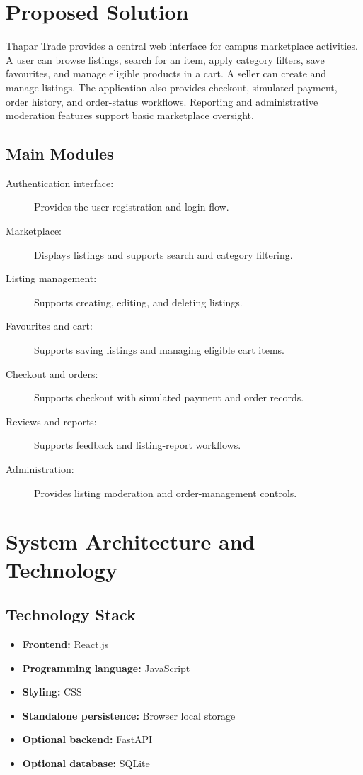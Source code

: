 \documentclass[12pt,a4paper]{report}
\begin{document}
\chapter{Proposed Solution}
Thapar Trade provides a central web interface for campus marketplace activities.
A user can browse listings, search for an item, apply category filters, save
favourites, and manage eligible products in a cart. A seller can create and
manage listings. The application also provides checkout, simulated payment,
order history, and order-status workflows. Reporting and administrative
moderation features support basic marketplace oversight.

\section{Main Modules}
\begin{description}
    \item[Authentication interface:] Provides the user registration and login flow.
    \item[Marketplace:] Displays listings and supports search and category filtering.
    \item[Listing management:] Supports creating, editing, and deleting listings.
    \item[Favourites and cart:] Supports saving listings and managing eligible cart items.
    \item[Checkout and orders:] Supports checkout with simulated payment and order records.
    \item[Reviews and reports:] Supports feedback and listing-report workflows.
    \item[Administration:] Provides listing moderation and order-management controls.
\end{description}

\chapter{System Architecture and Technology}
\section{Technology Stack}
\begin{itemize}
    \item \textbf{Frontend:} React.js
    \item \textbf{Programming language:} JavaScript
    \item \textbf{Styling:} CSS
    \item \textbf{Standalone persistence:} Browser local storage
    \item \textbf{Optional backend:} FastAPI
    \item \textbf{Optional database:} SQLite
\end{itemize}
\end{document}
